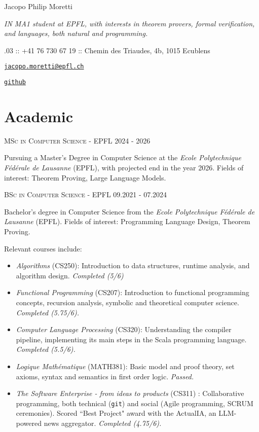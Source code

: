 \documentclass[11pt]{article}
\renewcommand{\url}[1]{{\texttt{#1}}}
\renewcommand{\line}[2]{{\vspace{4pt} \large \noindent\textsc{#1} \hfill #2}\vspace{4pt}}
\begin{document}
  \begin{center}
    \huge Jacopo Philip Moretti
  \end{center}

  \begin{adjustwidth}{1in}{1in}
    \textit{IN MA1 student at EPFL, with interests in theorem provers, formal verification, and languages, both natural and programming.}

    .03 :: +41 76 730 67 19 :: Chemin des Triaudes, 4b, 1015 Ecublens
    
    \noindent \href{https://people.epfl.ch/jacopo.moretti}{\url{jacopo.moretti@epfl.ch}}
    
    \noindent \href{https://github.com/quartztz}{\url{github}}
  \end{adjustwidth}

  \section*{Academic}

  \line{MSc in Computer Science - EPFL}{2024 - 2026}

  Pursuing a Master's Degree in Computer Science at the \textit{Ecole Polytechnique Fédérale de Lausanne} (EPFL), with projected end in the year 2026. Fields of interest: Theorem Proving, Large Language Models. 
  \vspace{1em}

  \line{BSc in Computer Science - EPFL}{09.2021 - 07.2024}

  Bachelor's degree in Computer Science from the \textit{Ecole Polytechnique Fédérale de Lausanne} (EPFL). Fields of interest: Programming Language Design, Theorem Proving. 

  Relevant courses include:
  \begin{itemize}
    \item \textit{Algorithms} (CS250): Introduction to data structures, runtime analysis, and algorithm design. \textit{Completed (5/6)}
    \item \textit{Functional Programming} (CS207): Introduction to functional programming concepts, recursion analysis, symbolic and theoretical computer science. \textit{Completed (5.75/6).}
    \item \textit{Computer Language Processing} (CS320): Understanding the compiler pipeline, implementing its main steps in the Scala programming language. \textit{Completed (5.5/6).}
    \item \textit{Logique Mathématique} (MATH381): Basic model and proof theory, set axioms, syntax and semantics in first order logic. \textit{Passed.}
    \item \textit{The Software Enterprise - from ideas to products} (CS311) : Collaborative programming, both technical (\texttt{git}) and social (Agile programming, SCRUM ceremonies). Scored ``Best Project" award with the ActualIA, an LLM-powered news aggregator. \textit{Completed (4.75/6).}
  \end{itemize}
\end{document}
